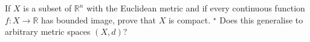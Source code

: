If $X$ is a subset of $\mathbb R^n$ with the Euclidean metric and if every continuous function $f:X\to\mathbb R$ has bounded image, prove that $X$ is compact. $^\star$ Does this generalise to arbitrary metric spaces $(X,d)$?

